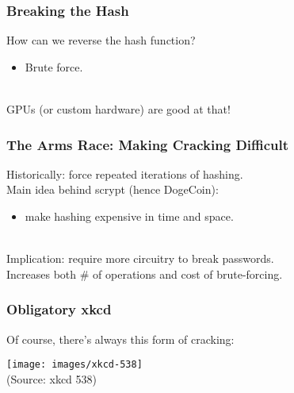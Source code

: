 \begin{frame}
  \frametitle{Breaking the Hash}
  
    How can we reverse the hash function?
    \begin{itemize}
    \item    Brute force.
    \end{itemize}~\\
    GPUs (or custom hardware) are good at that!
  
\end{frame}

\begin{frame}
  \frametitle{The Arms Race: Making Cracking Difficult}
  
    Historically: force repeated iterations of hashing.\\[1em]

    Main idea behind scrypt (hence DogeCoin):
    \begin{itemize}
    \item make hashing expensive in time and space.
    \end{itemize}~\\
    Implication: require more circuitry to break passwords.\\
    Increases both \# of operations and cost of brute-forcing.
  
\end{frame}



\begin{frame}
\frametitle{Obligatory xkcd}

Of course, there's always this form of cracking:
\begin{center}
\texttt{[image: images/xkcd-538]}\\
\hfill (Source: xkcd 538)
\end{center}

\end{frame}


